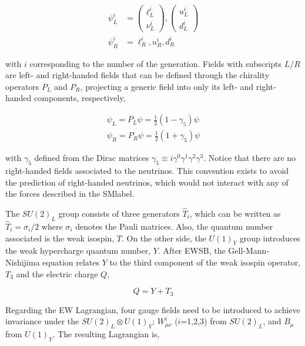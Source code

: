 \begin{equation}
\begin{split}
    \psi_L^i &= \begin{pmatrix}\ell^i_L\\ \nu^i_L \end{pmatrix}, \begin{pmatrix} u^i_L \\ d^i_L \end{pmatrix}\\
    \psi_R^i &= \ell^i_R, u^i_R, d^i_R
\end{split}
\end{equation}

with $i$ corresponding to the number of the generation. Fields with subscripts $L/R$ are left- and right-handed fields that can be defined
through the chirality operators $P_L$ and $P_R$, projecting a generic field into only its left- and right-handed components, respectively,

\begin{equation}
    \begin{split}
        \psi_L = P_L\psi = \frac{1}{2}(1-\gamma_5)\psi\\
        \psi_R = P_R\psi = \frac{1}{2}(1+\gamma_5)\psi
    \end{split}
\end{equation}

with $\gamma_5$ defined from the Dirac matrices $\gamma_5\equiv i\gamma^0\gamma^1\gamma^2\gamma^3$. Notice that there are no right-handed fields associated to the neutrinos. This convention exists to avoid the prediction of right-handed neutrinos, which would not interact with any of the forces described in the \acrshort{SMlabel}.

The $SU(2)_L$ group consists of three generators $\hat{T}_i$, which can be written as $\hat{T}_i=\sigma_i/2$ where $\sigma_i$
denotes the Pauli matrices. Also, the quantum number associated is the weak isospin, $T$.
On the other side, the $U(1)_Y$ group introduces the weak hypercharge quantum number, $Y$. After \acrshort{EWSB},
the Gell-Mann-Nishijima equation relates $Y$ to the third component of the weak isospin operator, $T_3$ and the electric charge $Q$,

\begin{equation}
Q = Y+T_3
\end{equation}

Regarding the \acrshort{EW} Lagrangian, four gauge fields need to be introduced to achieve invariance under the
$SU(2)_L\otimes U(1)_Y$: $W_{\mu\nu}^i$ ($i$=1,2,3) from $SU(2)_L$, and $B_\mu$ from $U(1)_Y$. The resulting Lagrangian is,

